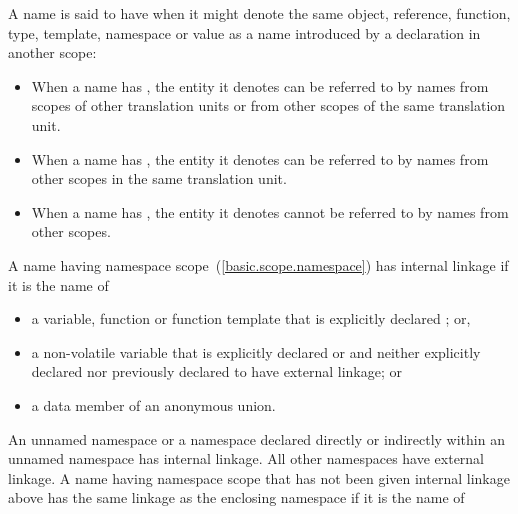 \pnum
{}%
%
%
%
A name is said to have  when it might denote the same
object, reference, function, type, template, namespace or value as a
name introduced by a declaration in another scope:

\begin{itemize}
\item When a name has ,
the entity it denotes
can be referred to by names from scopes of other translation units or
from other scopes of the same translation unit.

\item When a name has ,
the entity it denotes
can be referred to by names from other scopes in the same translation
unit.

\item When a name has , the entity it denotes
cannot be referred to by names from other scopes.
\end{itemize}

\pnum
{}%
%
%
%
%
%
A name having namespace scope~(\ref{basic.scope.namespace}) has internal
linkage if it is the name of

\begin{itemize}
\item a variable, function or function template that is
explicitly declared ; or,

\item a non-volatile variable that is explicitly declared  or
 and neither explicitly declared  nor previously
declared to have external linkage; or

\item a data member of an anonymous union.
\end{itemize}

\pnum
An unnamed namespace or a namespace declared directly or indirectly within an
unnamed namespace has internal linkage. All other namespaces have external linkage.
A name having namespace scope
that has not been given internal linkage above
has the same linkage as the enclosing namespace if it is the name of

